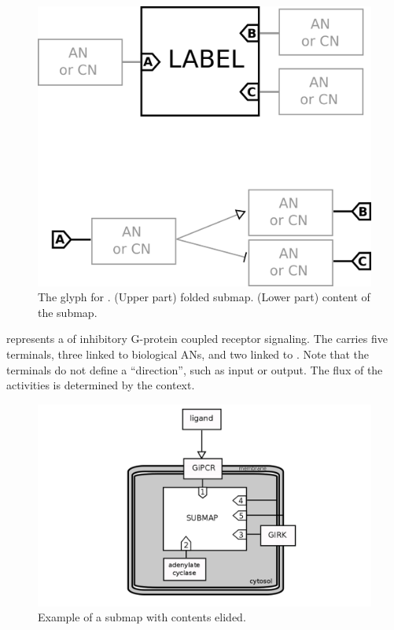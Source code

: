 \begin{figure}[H]
  \centering
  \includegraphics[scale = 0.3]{images/submap.png}
  \caption{The \AF glyph for . (Upper part) folded submap. (Lower part) content of the submap.}
  \label{fig:submap}
\end{figure}

 represents a  of inhibitory G-protein coupled receptor signaling. The  carries five terminals, three linked to biological ANs, and two linked to .  Note that the terminals do not define a ``direction'', such as input or output.  The flux of the activities is determined by the context.

\begin{figure}[H]
  \centering
  \includegraphics[scale = 0.5]{examples/submap-folded.png}
  \caption{Example of a submap with contents elided.}
  \label{fig:submap-folded}
\end{figure}


